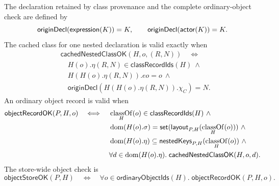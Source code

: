 The declaration retained by class provenance and the complete ordinary-object
check are defined by
\begin{equation}\label{eq:class-origin-declaration}
 \mathsf{originDecl}(\mathsf{expression}(K))=K,
 \qquad \mathsf{originDecl}(\mathsf{actor}(K))=K.
\end{equation}
The cached class for one nested declaration is valid exactly when
\begin{equation}\label{eq:cached-nested-class-validity}
\begin{aligned}
 &\mathsf{cachedNestedClassOK}(H,o,(R,N))\quad\Longleftrightarrow{}\\
 &\quad H(o).\eta(R,N)\in\mathsf{classRecordIds}(H)\ \land\\
 &\quad H(H(o).\eta(R,N)).eo=o\ \land\\
 &\quad\mathsf{originDecl}(H(H(o).\eta(R,N)).\chi_C)=N.
\end{aligned}
\end{equation}
An ordinary object record is valid when
\begin{equation}\label{eq:reflective-object-record-validity}
\begin{aligned}
 \mathsf{objectRecordOK}(P,H,o)\quad\Longleftrightarrow\quad{}
 &\mathop{\mathrm{classOf}}_H(o)\in\mathsf{classRecordIds}(H)\ \land\\
 &\mathop{\mathrm{dom}}(H(o).\sigma)=
   \mathsf{set}(\mathsf{layout}_{P,H}(\mathop{\mathrm{classOf}}_H(o)))\ \land\\
 &\mathop{\mathrm{dom}}(H(o).\eta)\subseteq
   \mathsf{nestedKeys}_{P,H}(\mathop{\mathrm{classOf}}_H(o))\ \land\\
 &\forall d\in\mathop{\mathrm{dom}}(H(o).\eta).\;\mathsf{cachedNestedClassOK}(H,o,d).
\end{aligned}
\end{equation}
The store-wide object check is
\begin{equation}\label{eq:reflective-object-validity}
 \mathsf{objectStoreOK}(P,H)\quad\Longleftrightarrow\quad
 \forall o\in\mathsf{ordinaryObjectIds}(H).\;
   \mathsf{objectRecordOK}(P,H,o).
\end{equation}

